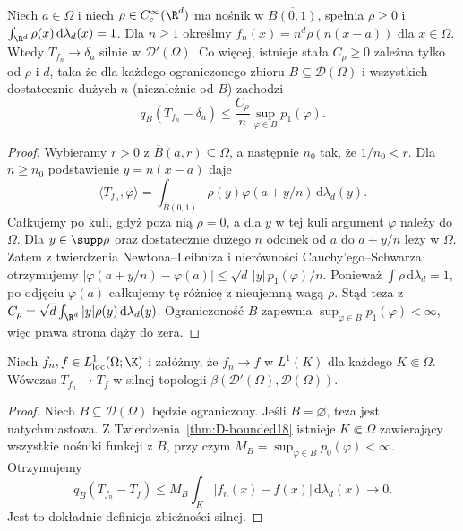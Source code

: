 \begin{twierdzenie}
\label{thm:mollifier-delta19}
Niech $a\in\Omega$ i niech
$\rho\in C_c^\infty(\R^d)$ ma nośnik w
$\overline{B(0,1)}$, spełnia $\rho\ge0$ i
$\int_{\R^d}\rho(x)\,\mathrm d\lambda_d(x)=1$.
Dla $n\ge1$ określmy
$f_n(x)=n^d\rho(n(x-a))$ dla $x\in\Omega$.
Wtedy $T_{f_n}\to\delta_a$ silnie w $\mathcal D'(\Omega)$.
Co więcej, istnieje stała $C_\rho\ge0$ zależna tylko od
$\rho$ i $d$, taka że dla każdego ograniczonego zbioru
$B\subseteq\mathcal D(\Omega)$ i wszystkich dostatecznie
dużych $n$ (niezależnie od $B$) zachodzi
\[q_B(T_{f_n}-\delta_a)\le
\frac{C_\rho}{n}\sup_{\varphi\in B}p_1(\varphi).\]
\end{twierdzenie}
\begin{proof}
Wybieramy $r>0$ z $\overline B(a,r)\subseteq\Omega$,
a następnie $n_0$ tak, że $1/n_0<r$.
Dla $n\ge n_0$ podstawienie $y=n(x-a)$ daje
\[\langle T_{f_n},\varphi\rangle
=\int_{\overline B(0,1)}\rho(y)\varphi(a+y/n)\,
\mathrm d\lambda_d(y).\]
Całkujemy po kuli, gdyż poza nią $\rho=0$,
a dla $y$ w tej kuli argument $\varphi$ należy do $\Omega$.
Dla $y\in\supp\rho$ oraz dostatecznie dużego $n$
odcinek od $a$ do $a+y/n$ leży w $\Omega$. Zatem
z twierdzenia Newtona--Leibniza i nierówności Cauchy'ego--Schwarza
otrzymujemy
$|\varphi(a+y/n)-\varphi(a)|\le
\sqrt d\,|y|\,p_1(\varphi)/n$.
Ponieważ $\int\rho\,\mathrm d\lambda_d=1$,
po odjęciu $\varphi(a)$ całkujemy tę różnicę
z nieujemną wagą $\rho$.
Stąd teza z
$C_\rho=\sqrt d\int_{\R^d}|y|\rho(y)\,
\mathrm d\lambda_d(y)$. Ograniczoność $B$ zapewnia
$\sup_{\varphi\in B}p_1(\varphi)<\infty$, więc prawa
strona dąży do zera.
\end{proof}



\begin{twierdzenie}
\label{thm:L1-to-strong19}
Niech $f_n,f\in L^1_{\mathrm{loc}}(\Omega;\K)$ i załóżmy,
że $f_n\to f$ w $L^1(K)$ dla każdego $K\Subset\Omega$.
Wówczas $T_{f_n}\to T_f$ w silnej topologii
$\beta(\mathcal D'(\Omega),\mathcal D(\Omega))$.
\end{twierdzenie}
\begin{proof}
Niech $B\subseteq\mathcal D(\Omega)$ będzie ograniczony.
Jeśli $B=\varnothing$, teza jest natychmiastowa.
Z Twierdzenia~\ref{thm:D-bounded18} istnieje
$K\Subset\Omega$ zawierający wszystkie nośniki funkcji
z $B$, przy czym $M_B=\sup_{\varphi\in B}p_0(\varphi)<\infty$.
Otrzymujemy
\[q_B(T_{f_n}-T_f)\le
M_B\int_K|f_n(x)-f(x)|\,\mathrm d\lambda_d(x)
\longrightarrow0.\]
Jest to dokładnie definicja zbieżności silnej.
\end{proof}

